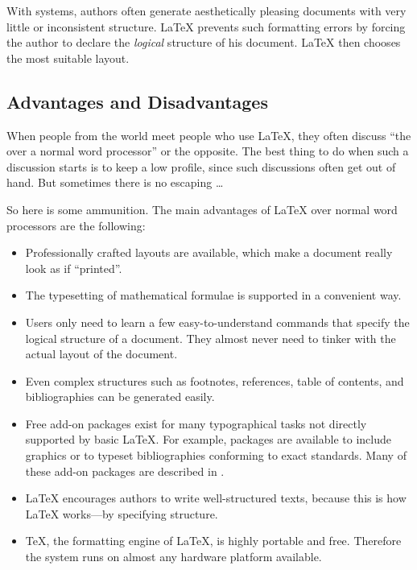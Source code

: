 With  systems, authors often generate aesthetically
pleasing documents with very little or inconsistent structure.
\LaTeX{} prevents such formatting errors by forcing the author to
declare the \emph{logical} structure of his document. \LaTeX{} then
chooses the most suitable layout.

\subsection{Advantages and Disadvantages}

When people from the  world meet people who use \LaTeX{},
they often discuss \enquote{the  over a normal
  word processor} or the opposite.  The best thing to do when such
a discussion starts is to keep a low profile, since such discussions
often get out of hand. But sometimes there is no escaping \ldots

\medskip\noindent So here is some ammunition. The main advantages
of \LaTeX{} over normal word processors are the following:

\begin{itemize}

  \item Professionally crafted layouts are available, which make a
        document really look as if \enquote{printed}.
  \item The typesetting of mathematical formulae is supported in a
        convenient way.
  \item Users only need to learn a few easy-to-understand commands
        that specify the logical structure of a document. They almost never
        need to tinker with the actual layout of the document.
  \item Even complex structures such as footnotes, references, table of
        contents, and bibliographies can be generated easily.
  \item Free add-on packages exist for many typographical tasks not directly
        supported by basic \LaTeX. For example, packages are available to
        include \PSi{} graphics or to typeset bibliographies conforming to
        exact standards. Many of these add-on packages are described in
        \companion.
  \item \LaTeX{} encourages authors to write well-structured texts,
        because this is how \LaTeX{} works---by specifying structure.
  \item \TeX, the formatting engine of \LaTeX, is highly portable and free.
        Therefore the system runs on almost any hardware platform
        available.

\end{itemize}

